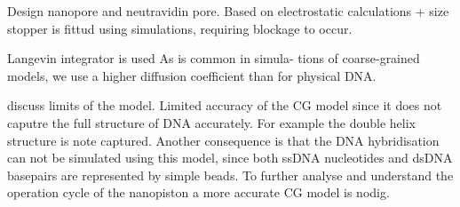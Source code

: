 Design nanopore and neutravidin pore. Based on electrostatic calculations + size stopper
is fittud using simulations, requiring blockage to occur.

Langevin integrator is used As is common in simula- tions of coarse-grained models, we
use a higher diffusion coefficient than for physical DNA.

discuss limits of the model. Limited accuracy of the CG model since it does not caputre
the full structure of DNA accurately. For example the double helix structure is note
captured. Another consequence is that the DNA hybridisation can not be simulated using
this model, since both ssDNA nucleotides and dsDNA basepairs are represented by simple
beads. To further analyse and understand the operation cycle of the nanopiston a more
accurate CG model is nodig.
